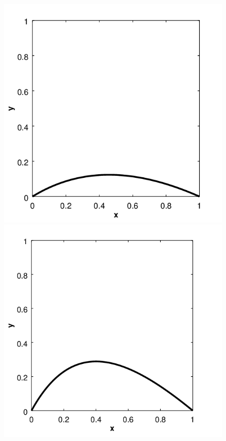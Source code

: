 \begin{enumerate}
\begin{itemize}
\begin{figure}[ht!]
  \centering
  \includegraphics[scale = 0.2]{eps_1.png}
  \includegraphics[scale = 0.2]{eps_2.png}

\end{figure}
\end{itemize}
\end{enumerate}
